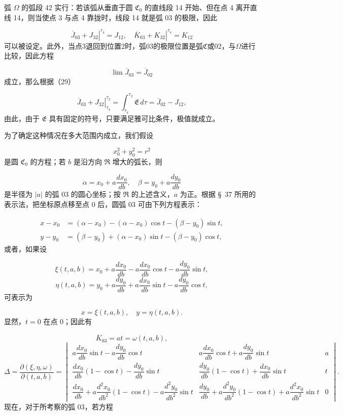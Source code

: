 \documentclass[11pt,a4paper,leqno]{article}
\begin{document}
弧 $\Omega$ 的弧段 42 实行：若该弧从垂直于圆 $\mathfrak{C}_0$ 的直线段 14 开始、但在点 4 离开直线 14，则当使点 3 与点 4 靠拢时，线段 14 就是弧 03 的极限，因此

\begin{equation}\tag{29}
\left.\overline{J}_{03}+J_{32}\right|^{\tau_4}=J_{12},\quad
\left.\overline{K}_{03}+K_{32}\right|^{\tau_4}=K_{12}
\end{equation}
可以被设定。此外，当点3退回到位置2时，弧03的极限位置是弧$\mathfrak{C}$或02，与$\Omega$进行比较，因此方程

\[
\lim \overline{J}_{03}=\overline{J}_{02}
\]
成立，那么根据（29）

\[
\left.\overline{J}_{03}+J_{32}\right|_{\tau_4}^{\tau_2}=\int_{\tau_4}^{\tau_2}\mathfrak{E}\,d\tau=\overline{J}_{02}-J_{12},
\]
由此，由于 $\mathfrak{E}$ 具有固定的符号，只要满足雅可比条件，极值就成立。

为了确定这种情况在多大范围内成立，我们假设

\[
x_0^2+y_0^2=r^2
\]
是圆 $\mathfrak{C}_0$ 的方程；若 $b$ 是沿方向 $\mathfrak{R}$ 增大的弧长，则

\[
\alpha=x_0+a\frac{dx_0}{db},\quad \beta=y_0+a\frac{dy_0}{db}
\]
是半径为 $|a|$ 的弧 03 的圆心坐标；按 $\mathfrak{R}$ 的上述含义，$a$ 为正。根据 \S~37 所用的表示法，把坐标原点移至点 0 后，圆弧 03 可由下列方程表示：

\[
\begin{aligned}
x-x_0&=(\alpha-x_0)-(\alpha-x_0)\cos t-(\beta-y_0)\sin t,\\
y-y_0&=(\beta-y_0)+(\alpha-x_0)\sin t-(\beta-y_0)\cos t,
\end{aligned}
\]
或者，如果设

\[
\xi(t,a,b)=x_0+a\frac{dx_0}{db}-a\frac{dx_0}{db}\cos t-a\frac{dy_0}{db}\sin t,
\]
\[
\eta(t,a,b)=y_0+a\frac{dy_0}{db}+a\frac{dx_0}{db}\sin t-a\frac{dy_0}{db}\cos t,
\]
可表示为

\[
x=\xi(t,a,b),\quad y=\eta(t,a,b).
\]
显然，$t=0$ 在点 0；因此有

\[
\overline{K}_{03}=at=\omega(t,a,b),
\]
\begingroup
\setlength{\arraycolsep}{1pt}
\[
\Delta=\frac{\partial(\xi,\eta,\omega)}{\partial(t,a,b)}=
\begin{vmatrix}
 a\dfrac{dx_0}{db}\sin t-a\dfrac{dy_0}{db}\cos t & a\dfrac{dx_0}{db}\cos t+a\dfrac{dy_0}{db}\sin t & a\\[1.0ex]
 \dfrac{dx_0}{db}(1-\cos t)-\dfrac{dy_0}{db}\sin t & \dfrac{dy_0}{db}(1-\cos t)+\dfrac{dx_0}{db}\sin t & t\\[1.0ex]
 \dfrac{dx_0}{db}+a\dfrac{d^2x_0}{db^2}(1-\cos t)-a\dfrac{d^2y_0}{db^2}\sin t & \dfrac{dy_0}{db}+a\dfrac{d^2y_0}{db^2}(1-\cos t)+a\dfrac{d^2x_0}{db^2}\sin t & 0
\end{vmatrix}.
\]
\endgroup
现在，对于所考察的弧 03，若方程
\end{document}
